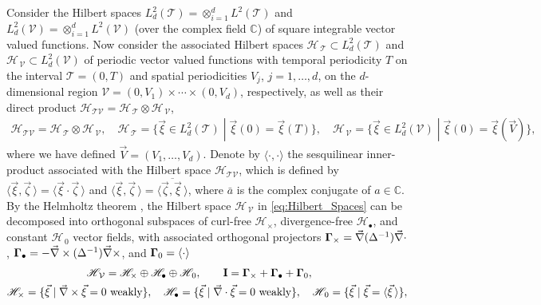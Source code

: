 \documentclass[11pt]{amsart}
\newcommand{\Ib}{\mathbf{I}}
\newcommand{\Tc}{\mathcal{T}}
\newcommand{\Vc}{\mathcal{V}}
\newcommand{\Hs}{\mathscr{H}}
\newcommand\bGamma{\mbox{\boldmath${\Gamma}$}}
\begin{document}
Consider the Hilbert spaces $L^2_d(\Tc)=\otimes_{i=1}^dL^2(\Tc)$ and
$L^2_d(\Vc)=\otimes_{i=1}^dL^2(\Vc)$ (over the complex field $\mathbb{C}$) of 
square integrable vector valued functions. Now consider the associated
Hilbert spaces $\Hs_{\,\Tc}\subset L^2_d(\Tc)$ and $\Hs_{\,\Vc}\subset L^2_d(\Vc)$
of periodic vector valued functions with temporal periodicity $T$ on
the interval $\Tc=(0,T)$ and spatial periodicities $V_j$, $j=1,\ldots,d$,
on the $d$-dimensional region $\Vc=(0,V_1)\times\cdots\times(0,V_d)$, respectively,
as well as their direct product
$\Hs_{\Tc\Vc}=\Hs_{\,\Tc}\otimes\Hs_{\,\Vc}$,
%
\begin{align}\label{eq:Hilbert_Spaces}
  \Hs_{\Tc\Vc}=\Hs_{\,\Tc}\otimes\Hs_{\,\Vc}, \quad
  \Hs_{\,\Tc}=\{ 
     \vec{\xi}\in L^2_d(\Tc)\;|\;
     \vec{\xi}(0)=\vec{\xi}(T) 
                        \}, \quad
  \Hs_{\,\Vc}=\{ 
     \vec{\xi}\in L^2_d(\Vc)\;|\;
     \vec{\xi}(0)=\vec{\xi}(\vec{V}) 
                        \}, 
\end{align}
%
where we have defined $\vec{V}=(V_1,\ldots,V_d)$. Denote by $\langle\cdot,\cdot\rangle$ the
sesquilinear inner-product associated with the Hilbert space
$\Hs_{\Tc\Vc}$, which is defined by
$\langle\vec{\xi},\vec{\zeta}\,\rangle=\langle\vec{\xi}\cdot\vec{\zeta}\,\rangle$  and
$\langle\vec{\xi},\vec{\zeta}\,\rangle=\overline{\langle\vec{\zeta},\vec{\xi}\,\rangle}$, where $\bar{a}$ 
is the complex conjugate of $a\in\mathbb{C}$. By the Helmholtz theorem 
\cite{Denaro:2003:0271,Bhatia:IEE:1077}, the 
Hilbert space $\Hs_{\,\Vc}$ in \eqref{eq:Hilbert_Spaces} can be
decomposed into orthogonal subspaces of curl-free $\Hs_\times$,
divergence-free $\Hs_\bullet$, and constant $\Hs_{\,0}$ vector fields, with
associated orthogonal projectors $\bGamma_\times=\vec{\nabla}(\Delta^{-1})\vec{\nabla}\cdot$, 
$\bGamma_\bullet=-\vec{\nabla}\times(\Delta^{-1})\vec{\nabla}\times$, and  $\bGamma_0=\langle\cdot\rangle$ 
\cite{Fannjiang:SIAM_JAM:333,MILTON:2002:TC}    
%
\begin{align}\label{eq:Helmholtz}
  &\Hs_{\,\Vc}=\Hs_\times\oplus\Hs_\bullet\oplus\Hs_{\,0},\qquad
  \Ib=\bGamma_\times+\bGamma_\bullet+\bGamma_0, \\  
  \Hs_\times=\{\vec{\xi}\;|\;\vec{\nabla}\times\vec{\xi}&=0 \text{ weakly}\}, \quad
  \Hs_\bullet
      =\{\vec{\xi}\;|\;\vec{\nabla}\cdot\vec{\xi}=0 \text{ weakly}\},   \quad
  \Hs_{\,0}
      =\{\vec{\xi}\;|\;\vec{\xi}=\langle\vec{\xi}\,\rangle\},
     \notag  
\end{align}
%
\end{document}
